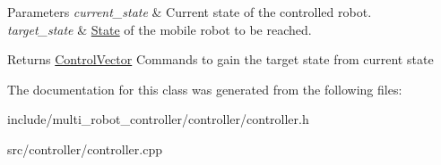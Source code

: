 \begin{DoxyParams}{Parameters}
{\em current\+\_\+state} & Current state of the controlled robot. \\
\hline
{\em target\+\_\+state} & \hyperlink{structController_1_1State}{State} of the mobile robot to be reached. \\
\hline
\end{DoxyParams}
\begin{DoxyReturn}{Returns}
\hyperlink{structController_1_1ControlVector}{Control\+Vector} Commands to gain the target state from current state 
\end{DoxyReturn}


The documentation for this class was generated from the following files\+:\begin{DoxyCompactItemize}
\item 
include/multi\+\_\+robot\+\_\+controller/controller/controller.\+h\item 
src/controller/controller.\+cpp\end{DoxyCompactItemize}
